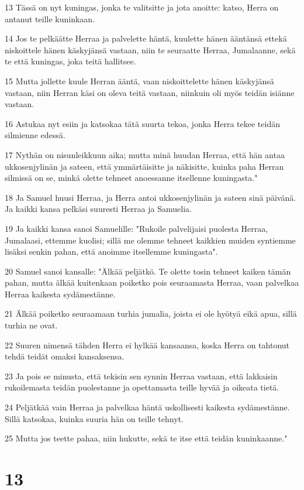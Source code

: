 \par 13 Tässä on nyt kuningas, jonka te valitsitte ja jota anoitte: katso, Herra on antanut teille kuninkaan.
\par 14 Jos te pelkäätte Herraa ja palvelette häntä, kuulette hänen ääntänsä ettekä niskoittele hänen käskyjänsä vastaan, niin te seuraatte Herraa, Jumalaanne, sekä te että kuningas, joka teitä hallitsee.
\par 15 Mutta jollette kuule Herran ääntä, vaan niskoittelette hänen käskyjänsä vastaan, niin Herran käsi on oleva teitä vastaan, niinkuin oli myös teidän isiänne vastaan.
\par 16 Astukaa nyt esiin ja katsokaa tätä suurta tekoa, jonka Herra tekee teidän silmienne edessä.
\par 17 Nythän on nisunleikkuun aika; mutta minä huudan Herraa, että hän antaa ukkosenjylinän ja sateen, että ymmärtäisitte ja näkisitte, kuinka paha Herran silmissä on se, minkä olette tehneet anoessanne itsellenne kuningasta."
\par 18 Ja Samuel huusi Herraa, ja Herra antoi ukkosenjylinän ja sateen sinä päivänä. Ja kaikki kansa pelkäsi suuresti Herraa ja Samuelia.
\par 19 Ja kaikki kansa sanoi Samuelille: "Rukoile palvelijaisi puolesta Herraa, Jumalaasi, ettemme kuolisi; sillä me olemme tehneet kaikkien muiden syntiemme lisäksi senkin pahan, että anoimme itsellemme kuningasta".
\par 20 Samuel sanoi kansalle: "Älkää peljätkö. Te olette tosin tehneet kaiken tämän pahan, mutta älkää kuitenkaan poiketko pois seuraamasta Herraa, vaan palvelkaa Herraa kaikesta sydämestänne.
\par 21 Älkää poiketko seuraamaan turhia jumalia, joista ei ole hyötyä eikä apua, sillä turhia ne ovat.
\par 22 Suuren nimensä tähden Herra ei hylkää kansaansa, koska Herra on tahtonut tehdä teidät omaksi kansaksensa.
\par 23 Ja pois se minusta, että tekisin sen synnin Herraa vastaan, että lakkaisin rukoilemasta teidän puolestanne ja opettamasta teille hyvää ja oikeata tietä.
\par 24 Peljätkää vain Herraa ja palvelkaa häntä uskollisesti kaikesta sydämestänne. Sillä katsokaa, kuinka suuria hän on teille tehnyt.
\par 25 Mutta jos teette pahaa, niin hukutte, sekä te itse että teidän kuninkaanne."

\chapter{13}

